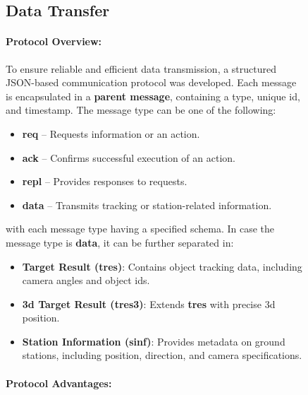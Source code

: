 \newpage
\begin{figure}[H]
	\subsection{Data Transfer} \label{subsec:DataTransfer}
	\centering
	\begin{minipage}{0.5\textwidth} %
		\raggedright %
		\paragraph{Protocol Overview:}
		
		To ensure reliable and efficient data transmission, a structured JSON-based communication protocol was developed. Each message is encapsulated in a \textbf{parent message}, containing a type, unique \acrfull{id}, and timestamp. The message type can be one of the following:
		
		\begin{itemize}
			\item \textbf{req} – Requests information or an action.
			\item \textbf{ack} – Confirms successful execution of an action.
			\item \textbf{repl} – Provides responses to requests.
			\item \textbf{data} – Transmits tracking or station-related information.
		\end{itemize}
		
		with each message type having a specified schema. In case the message type is \textbf{data}, it can be further separated in:
		
		\begin{itemize}
			\item \textbf{Target Result (tres)}: Contains object tracking data, including camera angles and object \acrshort{id}s.
			\item \textbf{\acrshort{3d} Target Result (tres3)}: Extends \textbf{tres} with precise \acrshort{3d} position.
			\item \textbf{Station Information (sinf)}: Provides metadata on ground stations, including position, direction, and camera specifications.
		\end{itemize}
		
		\paragraph{Protocol Advantages:} \
	

\end{minipage}
\end{figure}
